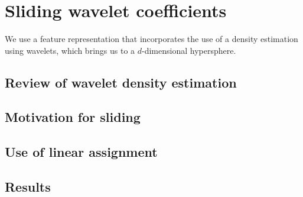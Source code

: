 \documentclass[../tech_report_1.tex]{subfiles}
\begin{document}
\section*{Sliding wavelet coefficients}

We use a feature representation that incorporates the use of a density estimation using wavelets, which brings us to a $d$-dimensional hypersphere.

\subsection*{Review of wavelet density estimation}

\subsection*{Motivation for sliding}

\subsection*{Use of linear assignment}

\subsection*{Results}
\end{document}
